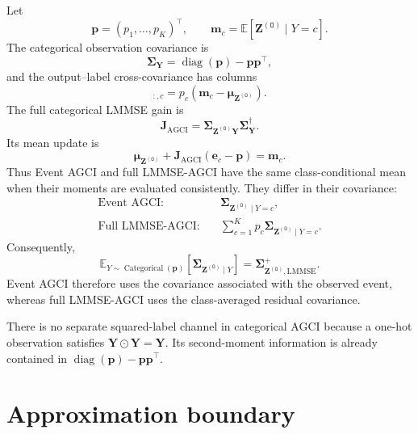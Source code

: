 \documentclass[11pt]{article}
\newcommand{\E}{\mathbb{E}}
\newcommand{\diag}{\operatorname{diag}}
\newcommand{\trans}{\intercal}
\newcommand{\Olayer}{\mathtt{O}}
\begin{document}
Let
\begin{equation}
 \bm p=(p_1,\ldots,p_K)^\trans,
 \qquad
 \bm m_c=\E[\bm Z^{(\Olayer)}\mid Y=c].
\end{equation}
The categorical observation covariance is
\begin{equation}
 \bm\Sigma_{\bm Y}
 =
 \diag(\bm p)-\bm p\bm p^\trans,
\end{equation}
and the output--label cross-covariance has columns
\begin{equation}
 [\bm\Sigma_{\bm Z^{(\Olayer)}\bm Y}]_{:,c}
 =
 p_c
 \left(
 \bm m_c-\bm\mu_{\bm Z^{(\Olayer)}}
 \right).
\end{equation}
The full categorical LMMSE gain is
\begin{equation}
 \mathbf J_{\mathrm{AGCI}}
 =
 \bm\Sigma_{\bm Z^{(\Olayer)}\bm Y}
 \bm\Sigma_{\bm Y}^{\dagger}.
\end{equation}
Its mean update is
\begin{equation}
 \bm\mu_{\bm Z^{(\Olayer)}}
 +
 \mathbf J_{\mathrm{AGCI}}
 (\bm e_c-\bm p)
 =
 \bm m_c.
\end{equation}
Thus Event AGCI and full LMMSE-AGCI have the same class-conditional mean when
their moments are evaluated consistently.  They differ in their covariance:
\begin{align}
 \text{Event AGCI:}\quad
 &\bm\Sigma_{\bm Z^{(\Olayer)}\mid Y=c},
 \\
 \text{Full LMMSE-AGCI:}\quad
 &\sum_{c=1}^{K}
 p_c\bm\Sigma_{\bm Z^{(\Olayer)}\mid Y=c}.
\end{align}
Consequently,
\begin{equation}
 \E_{Y\sim\operatorname{Categorical}(\bm p)}
 \left[
 \bm\Sigma_{\bm Z^{(\Olayer)}\mid Y}
 \right]
 =
 \bm\Sigma_{\bm Z^{(\Olayer)},\mathrm{LMMSE}}^+.
\end{equation}
Event AGCI therefore uses the covariance associated with the observed event,
whereas full LMMSE-AGCI uses the class-averaged residual covariance.

There is no separate squared-label channel in categorical AGCI because a
one-hot observation satisfies $\bm Y\odot\bm Y=\bm Y$.  Its second-moment
information is already contained in
$\diag(\bm p)-\bm p\bm p^\trans$.

\section{Approximation boundary}
\end{document}
